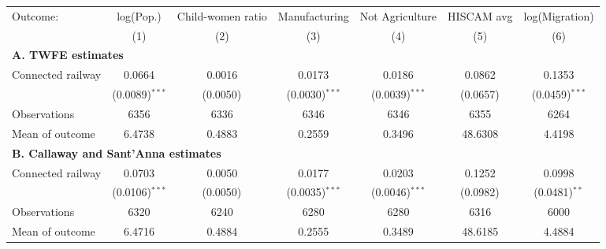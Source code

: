 \begin{tabular}{lcccccc}
  \toprule
  Outcome: & log(Pop.) & Child-women ratio & Manufacturing & Not Agriculture & HISCAM avg & log(Migration) \\
           & (1) & (2) & (3) & (4) & (5) & (6) \\
  \midrule
  \multicolumn{7}{l}{\textbf{A. TWFE estimates}}\\
  Connected railway &  0.0664 & 0.0016 & 0.0173 & 0.0186 & 0.0862 & 0.1353  \\
                    &  (0.0089)$^{***}$ & (0.0050)$^{}$ & (0.0030)$^{***}$ & (0.0039)$^{***}$ & (0.0657)$^{}$ & (0.0459)$^{***}$  \\
  \cmidrule(lr){2-7}
  Observations      &  6356 & 6336 & 6346 & 6346 & 6355 & 6264  \\
  Mean of outcome   &  6.4738 & 0.4883 & 0.2559 & 0.3496 & 48.6308 & 4.4198  \\
  \midrule
  \multicolumn{7}{l}{\textbf{B. Callaway and Sant'Anna estimates}}\\
  Connected railway &  0.0703 & 0.0050 & 0.0177 & 0.0203 & 0.1252 & 0.0998  \\
                    &  (0.0106)$^{***}$ & (0.0050)$^{}$ & (0.0035)$^{***}$ & (0.0046)$^{***}$ & (0.0982)$^{}$ & (0.0481)$^{**}$  \\
  \cmidrule(lr){2-7}
  Observations      &  6320 & 6240 & 6280 & 6280 & 6316 & 6000  \\
  Mean of outcome   &  6.4716 & 0.4884 & 0.2555 & 0.3489 & 48.6185 & 4.4884  \\
  \bottomrule
\end{tabular}
